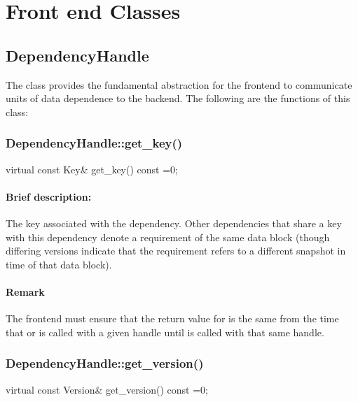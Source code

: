 
\section{Front end Classes}

\subsection{{DependencyHandle}}
The class  provides the fundamental abstraction for the frontend to communicate units of
data dependence to the backend. The following are the functions of this class:

\subsubsection{DependencyHandle::get\_key()}
\begin{CppCode}
    virtual const Key&
    get_key() const =0;
\end{CppCode}

\paragraph{Brief description:} The key associated with the dependency.
       Other dependencies that share a key with this dependency denote a requirement of the same
       data block (though differing versions indicate that the requirement refers to a different
       snapshot in time of that data block).
     
\paragraph{Remark} The frontend must ensure that the return value for  is the same from the
      time that  or  is called with a given
       handle until  is called with that same handle.


\subsubsection{DependencyHandle::get\_version()}
\begin{CppCode}
    virtual const Version&
    get_version() const =0;
\end{CppCode}

